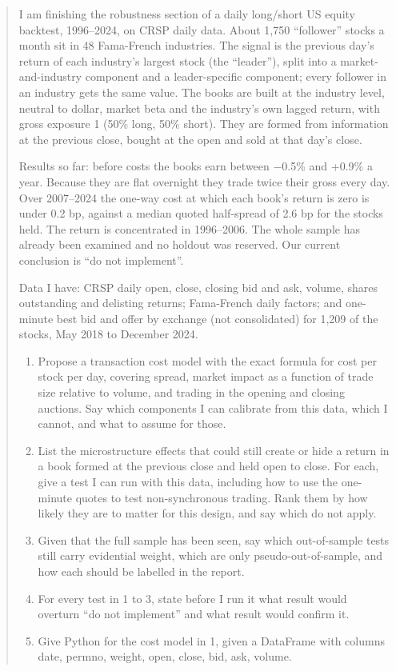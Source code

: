 \begin{quote}
I am finishing the robustness section of a daily long/short US equity backtest,
1996--2024, on CRSP daily data. About 1,750 ``follower'' stocks a month sit in 48
Fama-French industries. The signal is the previous day's return of each industry's
largest stock (the ``leader''), split into a market-and-industry component and a
leader-specific component; every follower in an industry gets the same value. The
books are built at the industry level, neutral to dollar, market beta and the
industry's own lagged return, with gross exposure 1 (50\% long, 50\% short). They are
formed from information at the previous close, bought at the open and sold at that
day's close.

Results so far: before costs the books earn between −0.5\% and +0.9\% a year. Because
they are flat overnight they trade twice their gross every day. Over 2007--2024 the
one-way cost at which each book's return is zero is under 0.2 bp, against a median
quoted half-spread of 2.6 bp for the stocks held. The return is concentrated in
1996--2006. The whole sample has already been examined and no holdout was reserved.
Our current conclusion is ``do not implement''.

Data I have: CRSP daily open, close, closing bid and ask, volume, shares outstanding
and delisting returns; Fama-French daily factors; and one-minute best bid and offer
by exchange (not consolidated) for 1,209 of the stocks, May 2018 to December 2024.

\begin{enumerate}
\def\labelenumi{\arabic{enumi}.}
\tightlist
\item
  Propose a transaction cost model with the exact formula for cost per stock per
  day, covering spread, market impact as a function of trade size relative to
  volume, and trading in the opening and closing auctions. Say which components I
  can calibrate from this data, which I cannot, and what to assume for those.
\item
  List the microstructure effects that could still create or hide a return in a
  book formed at the previous close and held open to close. For each, give a test
  I can run with this data, including how to use the one-minute quotes to test
  non-synchronous trading. Rank them by how likely they are to matter for this
  design, and say which do not apply.
\item
  Given that the full sample has been seen, say which out-of-sample tests still
  carry evidential weight, which are only pseudo-out-of-sample, and how each
  should be labelled in the report.
\item
  For every test in 1 to 3, state before I run it what result would overturn ``do
  not implement'' and what result would confirm it.
\item
  Give Python for the cost model in 1, given a DataFrame with columns date, permno,
  weight, open, close, bid, ask, volume.
\end{enumerate}
\end{quote}

